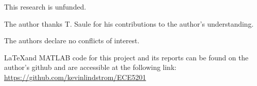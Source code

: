 \documentclass{optica-article}
\begin{document}

\begin{backmatter}
  This research is unfunded.

  The author thanks T. Saule
  for his contributions to the author's understanding.

  The authors declare no conflicts of interest.

    \LaTeX and MATLAB code for this project and
  its reports can be found on the author's github and are accessible 
  at the following link:
  \url{https://github.com/kevinlindstrom/ECE5201}
\end{backmatter}



\end{document}

